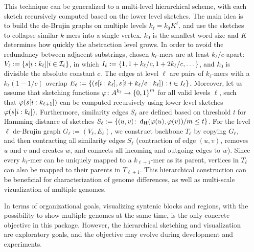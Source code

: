 This technique can be generalized to a multi-level hierarchical scheme, with each sketch recursively computed based on the lower level sketches. The main idea is to build the de-Brujin graphs on multiple levels $k_\ell=k_0 K^\ell$, and use the sketches to collapse similar $k$-mers into a single vertex. $k_0$ is the smallest word size and $K$ determines how quickly the abstraction level grows. In order to avoid the redundancy between adjacent substrings, chosen $k_\ell$-mers are at least $k_\ell/c$-apart:
$V_\ell:= \left\{s[i:k_\ell]\vert i\in \mathcal{I}_\ell\right\}$, in which 
$I_\ell:=\left\{1,1+k_\ell/c,1+2k_\ell/c,\dots\right\}$, and $k_0$ is divisible the absolute constant $c$. The edges at level $\ell$ are pairs of $k_\ell$-mers with a $k_\ell(1-1/c)$ overlap $E_\ell:=\left\{(s[i:k_\ell],s[i+k_\ell/c:k_\ell]): i\in I_\ell\right\}$. Moreover, let us assume that sketching functions $\operatorname{\varphi}\colon A^{k_\ell}\to  \left\{0,1\right\}^m$ for all valid levels $\ell$, such that $\operatorname{\varphi}(s[i:k_{\ell+1}])$ can be computed recursively using lower level sketches $\operatorname{\varphi}(s[i:k_{\ell}])$. Furthermore, similarity edges $S_\ell$ are defined based on threshold $t$ for Hamming distance of sketches $S_\ell:=\left\{(u,v)\colon \operatorname{\mathrm{d_{H}}}(\operatorname{\varphi}(u),\operatorname{\varphi}(v))/m\le t\right\}$. 
For the level $\ell$ de-Brujin graph $G_\ell:=(V_\ell,E_\ell)$, we construct backbone $T_\ell$ by copying $G_\ell$, and then contracting all similarity edges $S_\ell$ (contraction of edge $(u,v)$, removes $u$ and $v$ and creates $w$, and connects all incoming and outgoing edges to $w$). Since every $k_\ell$-mer can be uniquely mapped to a $k_{\ell+1}$-mer as its parent, vertices in $T_{\ell}$ can also be mapped to their parents in $T_{\ell+1}$. This hierarchical construction can be beneficial for characterization of genome differences, as well as multi-scale vizualization of multiple genomes. 


In terms of organizational goals, visualizing syntenic blocks and regions, with the possibility to show multiple genomes at the same time, is the only concrete objective in this package. However, the hierarchical sketching and visualization are exploratory goals, and the objective may evolve during development and experiments. 


